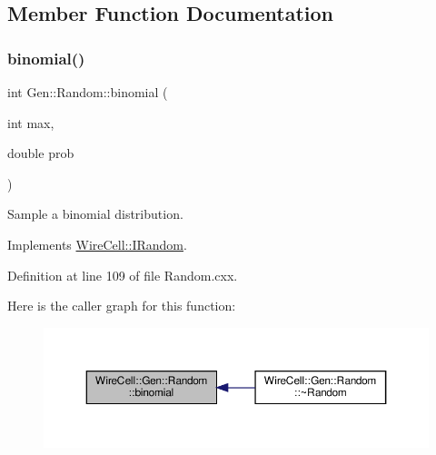 \subsection{Member Function Documentation}
\mbox{\label{class_wire_cell_1_1_gen_1_1_random_afb7a7a30f4f5c70a6388dc47c6464153}} 
\subsubsection{\texorpdfstring{binomial()}{binomial()}}
{\footnotesize\ttfamily int Gen\+::\+Random\+::binomial (\begin{DoxyParamCaption}\item[{int}]{max,  }\item[{double}]{prob }\end{DoxyParamCaption})\hspace{0.3cm}{\ttfamily [virtual]}}



Sample a binomial distribution. 



Implements \hyperlink{class_wire_cell_1_1_i_random_a4cb94097ddbd0edda3ad891b6d01b37d}{Wire\+Cell\+::\+I\+Random}.



Definition at line 109 of file Random.\+cxx.

Here is the caller graph for this function\+:
\nopagebreak
\begin{figure}[H]
\begin{center}
\leavevmode
\includegraphics[width=350pt]{class_wire_cell_1_1_gen_1_1_random_afb7a7a30f4f5c70a6388dc47c6464153_icgraph}
\end{center}
\end{figure}
\mbox{\label{class_wire_cell_1_1_gen_1_1_random_ae62de2bc5ed1078fb4f24a7dd0e9bae9}} 

